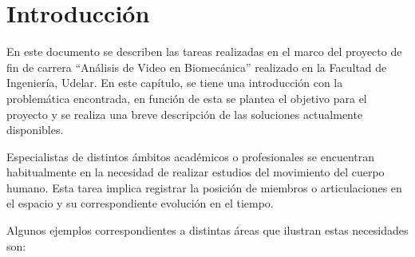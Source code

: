 \section{Introducción}

En este documento se describen las tareas realizadas en el marco del proyecto de fin de carrera ``Análisis de Video en Biomecánica'' realizado en la Facultad de Ingeniería, Udelar. En este capítulo, se tiene una introducción con la problemática encontrada, en función de esta se plantea el objetivo para el proyecto y se realiza 
una breve descripción de las soluciones actualmente disponibles.
\vspace{5 mm}

Especialistas de distintos ámbitos académicos o profesionales se encuentran habitualmente en la necesidad de realizar estudios del movimiento del cuerpo humano. Esta tarea implica registrar la posición de miembros o articulaciones en el espacio y su correspondiente evolución en el tiempo.

Algunos ejemplos correspondientes a distintas áreas que ilustran estas necesidades son:

